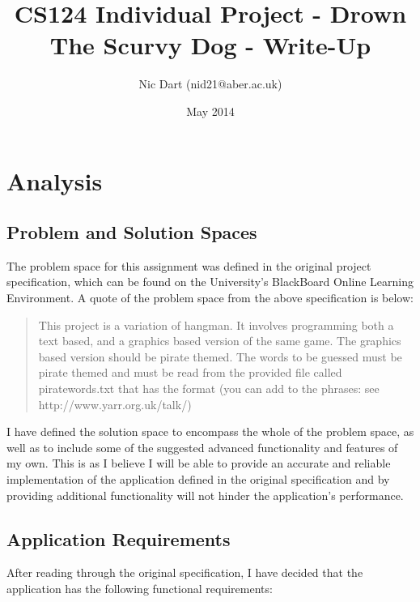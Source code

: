 \documentclass[a4paper, 11pt]{article}
\begin{document}
\title{CS124 Individual Project - Drown The Scurvy Dog - Write-Up}
\author{Nic Dart (nid21@aber.ac.uk)}
\date{May 2014}

\maketitle

\newpage

\tableofcontents

\newpage

\section{Analysis}

\subsection{Problem and Solution Spaces}

The problem space for this assignment was defined in the original project specification, which can be found on the University's BlackBoard Online Learning Environment. A quote of the problem space from the above specification is below:

\begin{quote}
This project is a variation of hangman. It involves programming both a text based, and a graphics based version of the same game. The graphics based version should be pirate themed. The words to be guessed must be pirate themed and must be read from the provided file called piratewords.txt that has the format (you can add to the phrases: see http://www.yarr.org.uk/talk/)
\end{quote}

I have defined the solution space to encompass the whole of the problem space, as well as to include some of the suggested advanced functionality and features of my own. This is as I believe I will be able to provide an accurate and reliable implementation of the application defined in the original specification and by providing additional functionality will not hinder the application's performance.

\subsection{Application Requirements}

After reading through the original specification, I have decided that the application has the following functional requirements:
\end{document}
